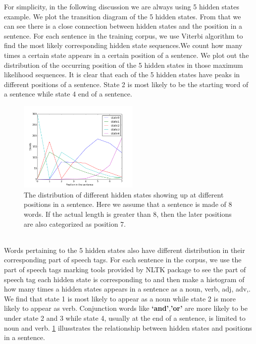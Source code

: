 For simplicity, in the following discussion we are always using 5 hidden states example.  We plot the transition diagram of the 5 hidden states. From that we can see there is a close connection between hidden states and the position in a sentence.
For each sentence in the training corpus, we use Viterbi algorithm to find the most likely corresponding hidden state sequences.We count how many times a certain state appears in a certain position of a sentence.  We plot out the distribution of the occurring position of the 5 hidden states in those maximum likelihood sequences. 
It is clear that each of the 5 hidden states have peaks in different positions of a sentence. State 2 is most likely to be the starting word of a sentence while state 4 end of a sentence.
 \begin{figure}
 \includegraphics[width=0.52\textwidth]{./figure/hiddenstates_position_in_the_sentence.png}
 \caption{The distribution of different hidden states showing up at different positions in a sentence. Here we assume that a sentence is made of 8 words. If the actual length is greater than 8, then the later positions are also categorized as position 7.\label{fig:position}}
\end{figure}
\\
Words pertaining to the 5 hidden states also have different distribution in their corresponding part of speech tags.  For each sentence in the corpus, we use the part of speech tags marking tools provided by NLTK package to see the part of speech tag each hidden state is corresponding to and then make a histogram of how many times a hidden states appears in a sentence as a noun, verb, adj, adv,. We find that state 1 is most likely to appear as a noun while state 2 is more likely to appear as verb. Conjunction words like \textbf{‘and’},\textbf{’or'} are more likely to be under state 2 and 3 while state 4, usually at the end of a sentence, is limited to noun and verb. \ref{fig:position} illusstrates the relationship between hidden states and positions in a sentence.
